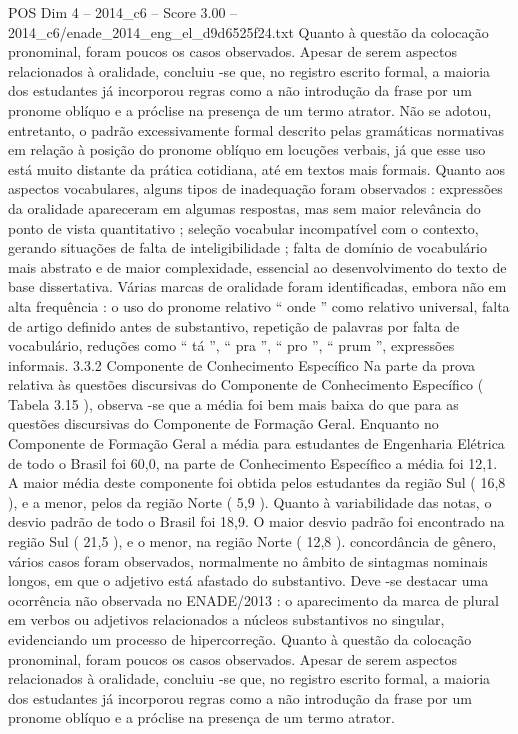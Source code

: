 \begin{textsample}{POS Dim 4 – 2014\_c6 – Score 3.00 – 2014\_c6/enade\_2014\_eng\_el\_d9d6525f24.txt}
Quanto à questão da colocação pronominal, foram poucos os casos observados.
Apesar de serem aspectos relacionados à oralidade, concluiu -se que, no registro escrito formal, a maioria dos estudantes já incorporou regras como a não introdução da frase por um pronome oblíquo e a próclise na presença de um termo atrator.
Não se adotou, entretanto, o padrão excessivamente formal descrito pelas gramáticas normativas em relação à posição do pronome oblíquo em locuções verbais, já que esse uso está muito distante da prática cotidiana, até em textos mais formais.
Quanto aos aspectos vocabulares, alguns tipos de inadequação foram observados : expressões da oralidade apareceram em algumas respostas, mas sem maior relevância do ponto de vista quantitativo ; seleção vocabular incompatível com o contexto, gerando situações de falta de inteligibilidade ; falta de domínio de vocabulário mais abstrato e de maior complexidade, essencial ao desenvolvimento do texto de base dissertativa.
Várias marcas de oralidade foram identificadas, embora não em alta frequência : o uso do pronome relativo “ onde ” como relativo universal, falta de artigo definido antes de substantivo, repetição de palavras por falta de vocabulário, reduções como “ tá ”, “ pra ”, “ pro ”, “ prum ”, expressões informais. 3.3.2 Componente de Conhecimento Específico Na parte da prova relativa às questões discursivas do Componente de Conhecimento Específico ( Tabela 3.15 ), observa -se que a média foi bem mais baixa do que para as questões discursivas do Componente de Formação Geral.
Enquanto no Componente de Formação Geral a média para estudantes de Engenharia Elétrica de todo o Brasil foi 60,0, na parte de Conhecimento Específico a média foi 12,1.
A maior média deste componente foi obtida pelos estudantes da região Sul ( 16,8 ), e a menor, pelos da região Norte ( 5,9 ).
Quanto à variabilidade das notas, o desvio padrão de todo o Brasil foi 18,9.
O maior desvio padrão foi encontrado na região Sul ( 21,5 ), e o menor, na região Norte ( 12,8 ). concordância de gênero, vários casos foram observados, normalmente no âmbito de sintagmas nominais longos, em que o adjetivo está afastado do substantivo.
Deve -se destacar uma ocorrência não observada no ENADE/2013 : o aparecimento da marca de plural em verbos ou adjetivos relacionados a núcleos substantivos no singular, evidenciando um processo de hipercorreção.
Quanto à questão da colocação pronominal, foram poucos os casos observados.
Apesar de serem aspectos relacionados à oralidade, concluiu -se que, no registro escrito formal, a maioria dos estudantes já incorporou regras como a não introdução da frase por um pronome oblíquo e a próclise na presença de um termo atrator.

\end{textsample}
